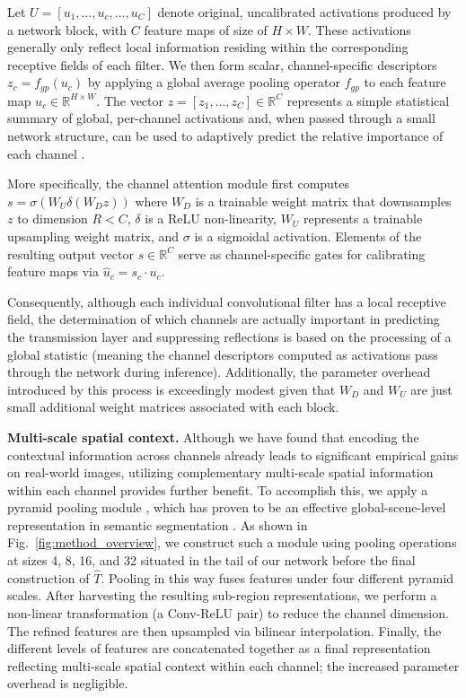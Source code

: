 \documentclass[10pt,twocolumn,letterpaper]{article}
\begin{document}
Let  $U =  [u_1, \ldots, u_c, \ldots, u_C ]$ denote original, uncalibrated activations produced by a network block, with $C$ feature maps of size of $H \times W$.  These activations generally only reflect local information residing within the corresponding receptive fields of each filter.  We then form scalar, channel-specific descriptors $z_c = f_{gp}(u_c)$ by applying a global average pooling operator $f_{gp}$ to each feature map $u_c \in \mathbb{R}^{H\times W}$. The vector $z = [z_1, \ldots, z_C] \in \mathbb{R}^C$ represents a simple statistical summary of global, per-channel activations and, when passed through a small network structure, can be used to adaptively predict the relative importance of each channel \cite{Hu_2018_CVPR}.  

More specifically, the channel attention module first computes
$s = \sigma (W_U \delta (W_D z))$
where $W_D$ is a trainable weight matrix that downsamples $z$ to dimension $R < C$, $\delta$ is a ReLU non-linearity, $W_U$ represents a trainable upsampling weight matrix, and $\sigma$ is a sigmoidal activation.  Elements of the resulting output vector $s \in \mathbb{R}^C$ serve as channel-specific gates for calibrating feature maps via
$\hat{u}_c = s_c \cdot u_c$.

Consequently, although each individual convolutional filter has a local receptive field, the determination of which channels are actually important in predicting the transmission layer and suppressing reflections is based on the processing of a global statistic (meaning the channel descriptors computed as activations pass through the network during inference).  Additionally, the parameter overhead introduced by this process is exceedingly modest given that $W_D$ and $W_U$ are just small additional weight matrices associated with each block.






\vspace{5pt}
{\noindent \bf Multi-scale spatial context.}
Although we have found that encoding the contextual information across channels already leads to significant empirical gains on real-world images, utilizing complementary multi-scale spatial information within each channel provides further benefit.  To accomplish this, we apply a pyramid pooling module \cite{He2015Spatial}, which has proven to be an effective global-scene-level representation in semantic segmentation \cite{zhao2017pyramid}.  As shown in Fig.~\ref{fig:method_overview}, we construct such a module using pooling operations at sizes 4, 8, 16, and 32 situated in the tail of our network before the final construction of $\hat{T}$.  Pooling in this way fuses features under four different pyramid scales. After harvesting the resulting sub-region representations, we perform a non-linear transformation (\ie a Conv-ReLU pair) to reduce the channel dimension. The refined features are then upsampled via bilinear interpolation. Finally, the different levels of features are concatenated together as a final representation reflecting multi-scale spatial context within each channel; the increased parameter overhead is negligible.
\end{document}
